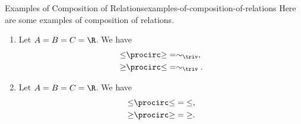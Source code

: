 \begin{example}{Examples of Composition of Relations}{examples-of-composition-of-relations}%
    Here are some examples of composition of relations.
    \begin{enumerate}
        \item\label{examples-of-composition-of-relations-1}Let $A=B=C=\R$. We have
            \begin{align*}
                \mathord{\leq}\procirc\mathord{\geq} &= \sim_{\triv},\\
                \mathord{\geq}\procirc\mathord{\leq} &= \sim_{\triv}.
            \end{align*}
        \item\label{examples-of-composition-of-relations-2}Let $A=B=C=\R$. We have
            \begin{align*}
                \mathord{\leq}\procirc\mathord{\leq} &= \mathord{\leq},\\
                \mathord{\geq}\procirc\mathord{\geq} &= \mathord{\geq}.
            \end{align*}
    \end{enumerate}
\end{example}
